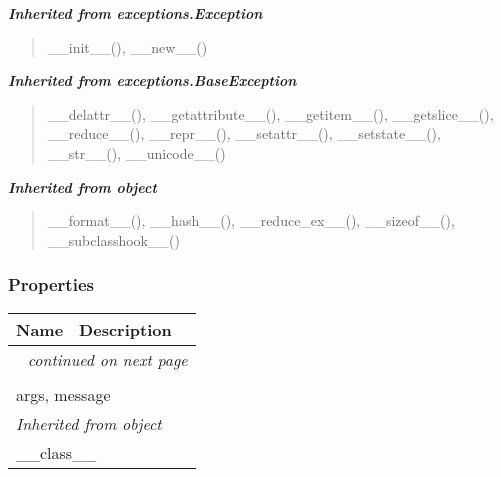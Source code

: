 \large{\textbf{\textit{Inherited from exceptions.Exception}}}

\begin{quote}
\_\_init\_\_(), \_\_new\_\_()
\end{quote}

\large{\textbf{\textit{Inherited from exceptions.BaseException}}}

\begin{quote}
\_\_delattr\_\_(), \_\_getattribute\_\_(), \_\_getitem\_\_(), \_\_getslice\_\_(), \_\_reduce\_\_(), \_\_repr\_\_(), \_\_setattr\_\_(), \_\_setstate\_\_(), \_\_str\_\_(), \_\_unicode\_\_()
\end{quote}

\large{\textbf{\textit{Inherited from object}}}

\begin{quote}
\_\_format\_\_(), \_\_hash\_\_(), \_\_reduce\_ex\_\_(), \_\_sizeof\_\_(), \_\_subclasshook\_\_()
\end{quote}


  \subsubsection{Properties}

    \vspace{-1cm}
\hspace{\varindent}\begin{longtable}{|p{\varnamewidth}|p{\vardescrwidth}|l}
\cline{1-2}
\cline{1-2} \centering \textbf{Name} & \centering \textbf{Description}& \\
\cline{1-2}
\endhead\cline{1-2}\multicolumn{3}{r}{\small\textit{continued on next page}}\\\endfoot\cline{1-2}
\endlastfoot\multicolumn{2}{|l|}{\textit{Inherited from exceptions.BaseException}}\\
\multicolumn{2}{|p{\varwidth}|}{\raggedright args, message}\\
\cline{1-2}
\multicolumn{2}{|l|}{\textit{Inherited from object}}\\
\multicolumn{2}{|p{\varwidth}|}{\raggedright \_\_class\_\_}\\
\cline{1-2}
\end{longtable}


